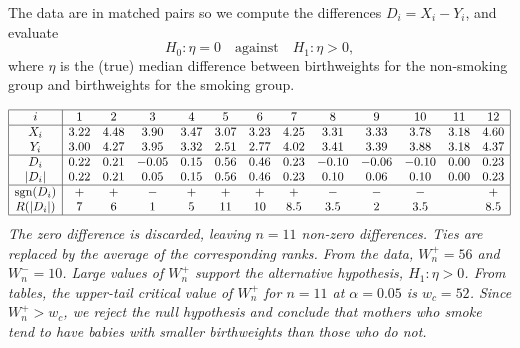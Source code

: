\begin{solution}
The data are in matched pairs so we compute the differences $D_i=X_i-Y_i$, and evaluate
\[
H_0:\eta = 0 \quad\text{against}\quad H_1:\eta > 0,
\]
where $\eta$ is the (true) median difference between birthweights for the non-smoking group and birthweights for the smoking group.

\small
\[\begin{array}{|c|cccccccccccc|} \hline
i			& 1      &  2     & 3      & 4      & 5      & 6      & 7      & 8      & 9      & 10     & 11     & 12   	\\ \hline
X_i			& 3.22   & 4.48   & 3.90   & 3.47   & 3.07   & 3.23   & 4.25   & 3.31   & 3.33   & 3.78   & 3.18   & 4.60 	\\ 
Y_i			& 3.00   & 4.27   & 3.95   & 3.32   & 2.51   & 2.77   & 4.02   & 3.41   & 3.39   & 3.88   & 3.18   & 4.37	\\ \hline
D_i			& 0.22   & 0.21   & -0.05  & 0.15   & 0.56   & 0.46   & 0.23   & -0.10  & -0.06  & -0.10  & 0.00  	& 0.23	\\
|D_i|		& 0.22   & 0.21   &  0.05  & 0.15   & 0.56   & 0.46   & 0.23   &  0.10  &  0.06  &  0.10  & 0.00  	& 0.23	\\ \hline
\text{sgn}(D_i)	& +      & +      & -      & +      & +      & +      & +      & -      & -      & -      &      	& +  	\\ 
R(|D_i|)		& 7      & 6      & 1      & 5      & 11     & 10     & 8.5    &  3.5   &  2     &  3.5   &      	& 8.5  	\\ \hline
\end{array}\]
\vspace*{-2ex}\normalsize
\bit
\it The zero difference is discarded, leaving $n=11$ non-zero differences.
\it Ties are replaced by the average of the corresponding ranks.
\eit
From the data, $W^{+}_n = 56$ and $W^{-}_n = 10$. \Big[Check: $W^{+}_n + W^{-}_n = 66 = \frac{1}{2}n(n+1)$.\Big]
\bit
\it Large values of $W^{+}_n$ support the alternative hypothesis, $H_1:\eta > 0$. 
\it From tables, the upper-tail critical value of $W^{+}_n$ for $n=11$ at $\alpha=0.05$ is $w_c = 52$. 
\eit
Since $W^{+}_n > w_c$, we reject the null hypothesis and conclude that mothers who smoke tend to have babies with smaller birthweights than those who do not. 
\end{solution}

